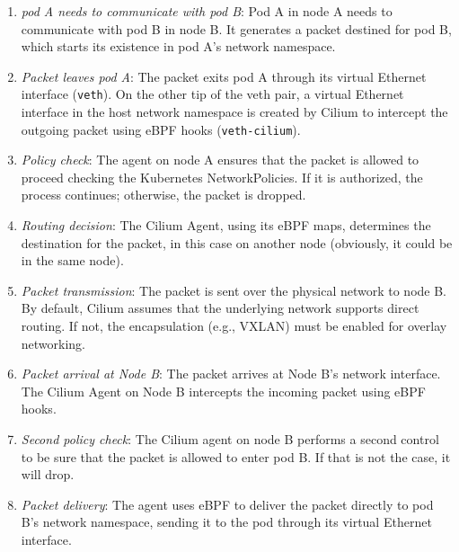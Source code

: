\begin{enumerate}
  \itemsep0em
  \item \textit{pod A needs to communicate with pod B}: Pod A in node A needs to
    communicate with pod B in node B. It generates a packet destined for pod B,
    which starts its existence in pod A's network namespace.
  \item \textit{Packet leaves pod A}: The packet exits pod A through its virtual
    Ethernet interface (\texttt{veth}). On the other tip of the veth pair, a
    virtual Ethernet interface in the host network namespace is created by
    Cilium to intercept the outgoing packet using eBPF hooks
    (\texttt{veth-cilium}).
  \item \textit{Policy check}: The agent on node A ensures that the packet is
    allowed to proceed checking the Kubernetes NetworkPolicies. If it is
    authorized,  the process continues; otherwise, the packet is dropped.
  \item \textit{Routing decision}: The Cilium Agent, using its eBPF maps,
    determines the destination for the packet, in this case on another node
    (obviously, it could be in the same node).
  \item \textit{Packet transmission}: The packet is sent over the physical
    network to node B. By default, Cilium assumes that the underlying network
    supports direct routing. If not, the encapsulation (e.g., VXLAN) must be
    enabled for overlay networking.
  \item \textit{Packet arrival at Node B}: The packet arrives at Node B's
    network interface. The Cilium Agent on Node B intercepts the incoming packet
    using eBPF hooks.
  \item \textit{Second policy check}: The Cilium agent on node B performs a
    second control to be sure that the packet is allowed to enter pod B.
    If that is not the case, it will drop.
  \item \textit{Packet delivery}: The agent uses eBPF to deliver the packet
    directly to pod B's network namespace, sending it to the pod through its
    virtual Ethernet interface.
\end{enumerate}

